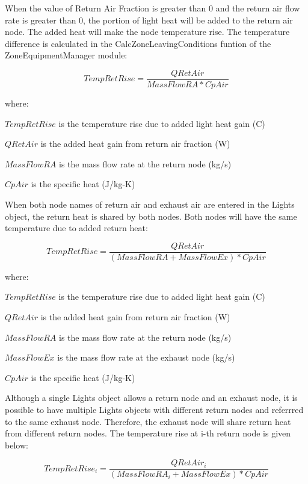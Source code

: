 When the value of Return Air Fraction is greater than 0 and  the return air flow rate is greater than 0, the portion of light heat will be added to the return air node. The added heat will make the node temperature rise. The temperature difference is calculated in the CalcZoneLeavingConditions funtion of the ZoneEquipmentManager module:


\begin{equation}
TempRetRise =  \frac{QRetAir} {MassFlowRA * CpAir}
\end{equation}

where:

\(TempRetRise\) is the temperature rise due to added light heat gain (C)

\(QRetAir\) is the added heat gain from return air fraction (W)

\(MassFlowRA\) is the mass flow rate at the return node (kg/s)

\(CpAir\) is the specific heat (J/kg-K)

When both node names of return air and exhaust air are entered in the Lights object, the return heat is shared by both nodes. Both nodes will have the same temperature due to added return heat:

\begin{equation}
TempRetRise = \frac{QRetAir} {(MassFlowRA + MassFlowEx ) * CpAir}
\end{equation}

where:

\(TempRetRise\) is the temperature rise due to added light heat gain (C)

\(QRetAir\) is the added heat gain from return air fraction (W)

\(MassFlowRA\) is the mass flow rate at the return node (kg/s)

\(MassFlowEx\) is the mass flow rate at the exhaust node (kg/s)

\(CpAir\) is the specific heat (J/kg-K)

Although a single Lights object allows a return node and an exhaust node, it is possible to have multiple Lights objects with different return nodes and referrred to the same exhaust node. Therefore, the exhaust node will share return heat from different return nodes. The temperature rise at i-th return node is given below:

\begin{equation}
TempRetRise_i = \frac{QRetAir_i} {(MassFlowRA_i + MassFlowEx ) * CpAir}
\end{equation}


